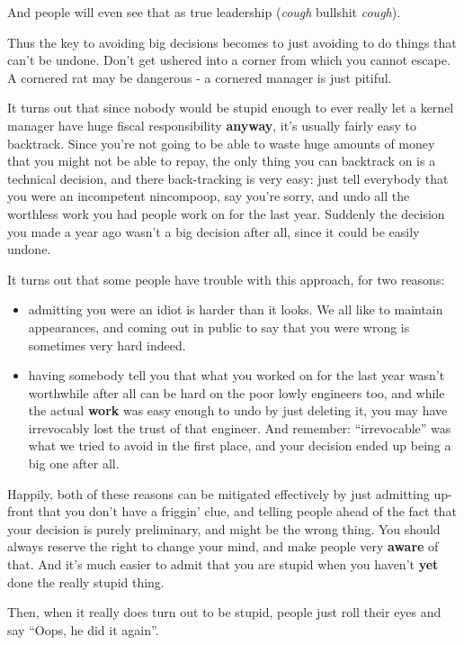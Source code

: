 \documentclass[a4paper,8pt,english]{sphinxmanual}
\begin{document}
And people will even see that as true leadership (\emph{cough} bullshit
\emph{cough}).

Thus the key to avoiding big decisions becomes to just avoiding to do
things that can't be undone.  Don't get ushered into a corner from which
you cannot escape.  A cornered rat may be dangerous - a cornered manager
is just pitiful.

It turns out that since nobody would be stupid enough to ever really let
a kernel manager have huge fiscal responsibility \textbf{anyway}, it's usually
fairly easy to backtrack.  Since you're not going to be able to waste
huge amounts of money that you might not be able to repay, the only
thing you can backtrack on is a technical decision, and there
back-tracking is very easy: just tell everybody that you were an
incompetent nincompoop, say you're sorry, and undo all the worthless
work you had people work on for the last year.  Suddenly the decision
you made a year ago wasn't a big decision after all, since it could be
easily undone.

It turns out that some people have trouble with this approach, for two
reasons:
\begin{itemize}
\item {} 
admitting you were an idiot is harder than it looks.  We all like to
maintain appearances, and coming out in public to say that you were
wrong is sometimes very hard indeed.

\item {} 
having somebody tell you that what you worked on for the last year
wasn't worthwhile after all can be hard on the poor lowly engineers
too, and while the actual \textbf{work} was easy enough to undo by just
deleting it, you may have irrevocably lost the trust of that
engineer.  And remember: ``irrevocable'' was what we tried to avoid in
the first place, and your decision ended up being a big one after
all.

\end{itemize}

Happily, both of these reasons can be mitigated effectively by just
admitting up-front that you don't have a friggin' clue, and telling
people ahead of the fact that your decision is purely preliminary, and
might be the wrong thing.  You should always reserve the right to change
your mind, and make people very \textbf{aware} of that.  And it's much easier
to admit that you are stupid when you haven't \textbf{yet} done the really
stupid thing.

Then, when it really does turn out to be stupid, people just roll their
eyes and say ``Oops, he did it again''.
\end{document}
